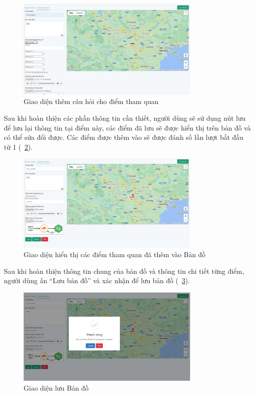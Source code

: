 \begin{figure}[h]
    \centering
    \includegraphics[width=0.8\textwidth]{figures/editor-point-question.jpg}
    \caption{Giao diện thêm câu hỏi cho điểm tham quan}
    \label{fig:editor-point-question}
\end{figure}
\newpage
Sau khi hoàn thiện các phần thông tin cần thiết, người dùng sẽ sử dụng nút lưu
để lưu lại thông tin tại điểm này, các điểm đã lưu sẽ được hiển thị trên bản đồ và có
thể sửa đổi được. Các điểm được thêm vào sẽ được đánh số lần lượt bắt đầu từ 1 (\figurename~\ref{fig:editor-point-number}).
\begin{figure}
    \centering
    \includegraphics[width=0.8\textwidth]{figures/editor-point-number.jpg}
    \caption{Giao diện hiển thị các điểm tham quan đã thêm vào Bản đồ}
    \label{fig:editor-point-number}
\end{figure}
Sau khi hoàn thiện thông tin chung của bản đồ và thông tin chi tiết từng điểm,
người dùng ấn “Lưu bản đồ” và xác nhận để lưu bản đồ (\figurename~\ref{fig:editor-save-map}).
\begin{figure}[h]
    \centering
    \includegraphics[width=0.8\textwidth]{figures/editor-save-map.jpg}
    \caption{Giao diện lưu Bản đồ}
    \label{fig:editor-save-map}
\end{figure}

